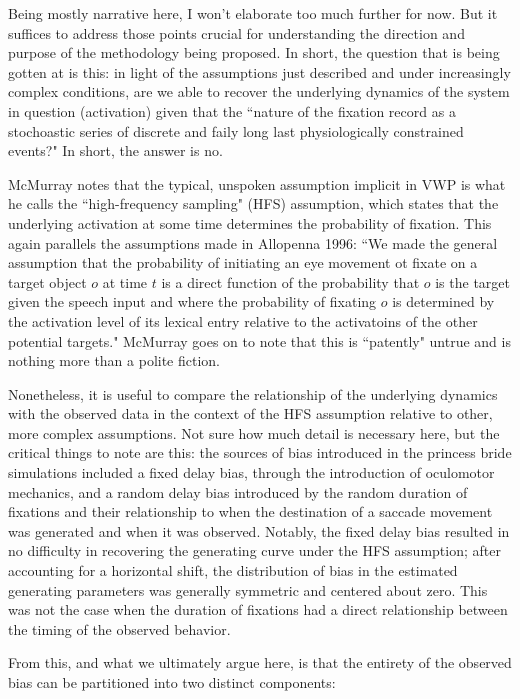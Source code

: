 \documentclass{article}
\begin{document}
Being mostly narrative here, I won't elaborate too much further for now. But it suffices to address those points crucial for understanding the direction and purpose of the methodology being proposed. In short, the question that is being gotten at is this: in light of the assumptions just described and under increasingly complex conditions, are we able to recover the underlying dynamics of the system in question (activation) given that the ``nature of the fixation record as a stochoastic series of discrete and faily long last physiologically constrained events?" In short, the answer is no. 

McMurray notes that the typical, unspoken assumption implicit in VWP is what he calls the ``high-frequency sampling" (HFS) assumption, which states that the underlying activation at some time determines the probability of fixation. This again parallels the assumptions made in Allopenna 1996: ``We made the general assumption that the probability of initiating an eye movement ot fixate on a target object $o$ at time $t$ is a direct function of the probability that $o$ is the target given the speech input and where the probability of fixating $o$ is determined by the activation level of its lexical entry relative to the activatoins of the other potential targets." McMurray goes on to note that this is ``patently" untrue and is nothing more than a polite fiction.

Nonetheless, it is useful to compare the relationship of the underlying dynamics with the observed data in the context of the HFS assumption relative to other, more complex assumptions. Not sure how much detail is necessary here, but the critical things to note are this: the sources of bias introduced in the princess bride simulations included a fixed delay bias, through the introduction of oculomotor mechanics, and a random delay bias introduced by the random duration of fixations and their relationship to when the destination of a saccade movement was generated and when it was observed. Notably, the fixed delay bias resulted in no difficulty in recovering the generating curve under the HFS assumption; after accounting for a horizontal shift, the distribution of bias in the estimated generating parameters was generally symmetric and centered about zero. This was not the case when the duration of fixations had a direct relationship between the timing of the observed behavior.

From this, and what we ultimately argue here, is that the entirety of the observed bias can be partitioned into two distinct components:
\end{document}
